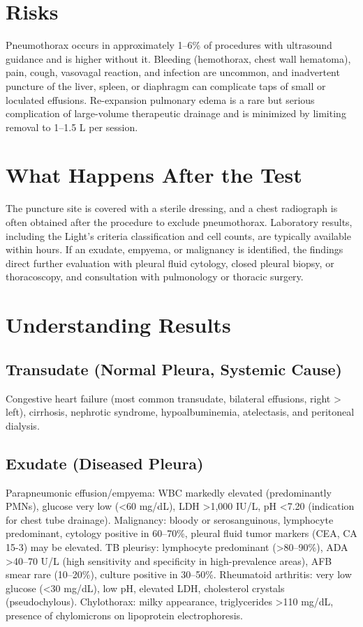 \section*{Risks}
Pneumothorax occurs in approximately 1--6\% of procedures with ultrasound guidance and is higher without it. Bleeding (hemothorax, chest wall hematoma), pain, cough, vasovagal reaction, and infection are uncommon, and inadvertent puncture of the liver, spleen, or diaphragm can complicate taps of small or loculated effusions. Re-expansion pulmonary edema is a rare but serious complication of large-volume therapeutic drainage and is minimized by limiting removal to 1--1.5 L per session.
\section*{What Happens After the Test}
The puncture site is covered with a sterile dressing, and a chest radiograph is often obtained after the procedure to exclude pneumothorax. Laboratory results, including the Light's criteria classification and cell counts, are typically available within hours. If an exudate, empyema, or malignancy is identified, the findings direct further evaluation with pleural fluid cytology, closed pleural biopsy, or thoracoscopy, and consultation with pulmonology or thoracic surgery.
\section*{Understanding Results}
\subsection*{Transudate (Normal Pleura, Systemic Cause)}
Congestive heart failure (most common transudate, bilateral effusions, right > left), cirrhosis, nephrotic syndrome, hypoalbuminemia, atelectasis, and peritoneal dialysis.
\subsection*{Exudate (Diseased Pleura)}
Parapneumonic effusion/empyema: WBC markedly elevated (predominantly PMNs), glucose very low (<60 mg/dL), LDH >1,000 IU/L, pH <7.20 (indication for chest tube drainage). Malignancy: bloody or serosanguinous, lymphocyte predominant, cytology positive in 60--70\%, pleural fluid tumor markers (CEA, CA 15-3) may be elevated. TB pleurisy: lymphocyte predominant (>80--90\%), ADA >40--70 U/L (high sensitivity and specificity in high-prevalence areas), AFB smear rare (10--20\%), culture positive in 30--50\%. Rheumatoid arthritis: very low glucose (<30 mg/dL), low pH, elevated LDH, cholesterol crystals (pseudochylous). Chylothorax: milky appearance, triglycerides >110 mg/dL, presence of chylomicrons on lipoprotein electrophoresis.
